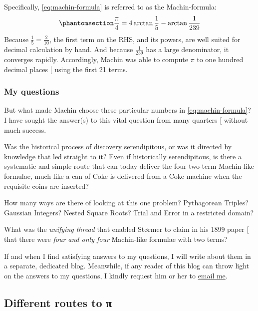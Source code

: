 \documentclass[
  a4paper,
]{article}
\begin{document}
Specifically, \cref{eq:machin-formula} is referred to as the
Machin-formula:
\begin{equation}\phantomsection\label{eq:machin-formula}{
\frac{\pi}{4} = 4\arctan\frac{1}{5} - \arctan\frac {1}{239}
}\end{equation} Because \(\frac{1}{5} = \frac{2}{10}\), the first term
on the RHS, and its powers, are well suited for decimal calculation by
hand. And because \(\frac {1}{239}\) has a large denominator, it
converges rapidly. Accordingly, Machin was able to compute \(\pi\) to
one hundred decimal places {[}\citeproc{ref-beckmann-1971}{23}{]} using
the first 21 terms.

\subsubsection{My questions}\label{my-questions}

But what made Machin choose these particular numbers in
\cref{eq:machin-formula}? I have sought the answer(s) to this vital
question from many quarters {[}\citeproc{ref-mse-question-2024}{24}{]}
without much success.

Was the historical process of discovery serendipitous, or was it
directed by knowledge that led straight to it? Even if historically
serendipitous, is there a systematic and simple route that can today
deliver the four two-term Machin-like formulae, much like a can of Coke
is delivered from a Coke machine when the requisite coins are inserted?

How many ways are there of looking at this one problem? Pythagorean
Triples? Gaussian Integers? Nested Square Roots? Trial and Error in a
restricted domain?

What was the \emph{unifying thread} that enabled Størmer to claim in his
1899 paper {[}\citeproc{ref-stormer-1899}{25}{]} that there were
\emph{four and only four} Machin-like formulae with two terms?

If and when I find satisfying answers to my questions, I will write
about them in a separate, dedicated blog. Meanwhile, if any reader of
this blog can throw light on the answers to my questions, I kindly
request him or her to \href{mailto:feedback.swanlotus@gmail.com}{email
me}.

\subsection{Different routes to π}\label{different-routes-to-ux3c0}
\end{document}
